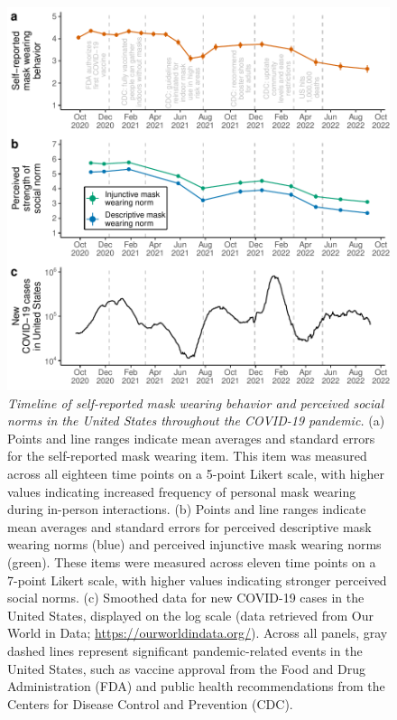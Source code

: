 \documentclass[
  man,floatsintext]{apa6}
\begin{document}
\begin{figure}
\centering
\includegraphics{manuscript_files/figure-latex/plotTimeline-1.pdf}
\caption{\label{fig:plotTimeline}\emph{Timeline of self-reported mask wearing behavior and perceived social norms in the United States throughout the COVID-19 pandemic.} (a) Points and line ranges indicate mean averages and standard errors for the self-reported mask wearing item. This item was measured across all eighteen time points on a 5-point Likert scale, with higher values indicating increased frequency of personal mask wearing during in-person interactions. (b) Points and line ranges indicate mean averages and standard errors for perceived descriptive mask wearing norms (blue) and perceived injunctive mask wearing norms (green). These items were measured across eleven time points on a 7-point Likert scale, with higher values indicating stronger perceived social norms. (c) Smoothed data for new COVID-19 cases in the United States, displayed on the log scale (data retrieved from Our World in Data; \url{https://ourworldindata.org/}). Across all panels, gray dashed lines represent significant pandemic-related events in the United States, such as vaccine approval from the Food and Drug Administration (FDA) and public health recommendations from the Centers for Disease Control and Prevention (CDC).}
\end{figure}
\end{document}
